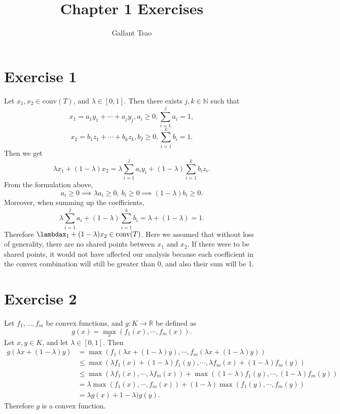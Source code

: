 \documentclass{article}
\title{Chapter 1 Exercises}
\author{Gallant Tsao}
\date{}
\begin{document}
\maketitle


\section*{Exercise 1}
Let $x_1, x_2 \in \text{conv}(T)$, and $\lambda \in [0, 1]$. Then there exists $j, k \in \mathbb{N}$ such that 
\[ x_1 = a_1 y_1 + \cdots + a_j y_j, a_i \geq 0, \sum_{i = 1}^{j} a_i = 1, \]
\[ x_2 = b_1 z_1 + \cdots + b_k z_k, b_I \geq 0, \sum_{i = 1}^{k} b_i = 1. \]
Then we get 
\[ \lambda x_1 + (1 - \lambda) x_2 
= \lambda \sum_{i = 1}^{j} a_i y_i + (1 - \lambda)\sum_{i = 1}^{k} b_i z_i. \]
From the formulation above, 
\[ a_i \geq 0 \implies \lambda a_i \geq 0, \ b_i \geq 0 \implies (1 - \lambda) b_i \geq 0. \]
Moreover, when summing up the coefficients, 
\[ \lambda \sum_{i = 1}^{j} a_i + (1 - \lambda) \sum_{i = 1}^{k} b_i = \lambda + (1 - \lambda) = 1. \]
Therefore $\lambdax_1 + (1 - \lambda)x_2 \in \text{conv}(T)$. Here we assumed that without loss of generality, 
there are no shared 
points between $x_1$ and $x_2$. If there were to be shared points, it would not have affected our analysis 
because each coefficient 
in the convex combination will still be greater than 0, and also their sum will be 1.


\newpage
\section*{Exercise 2}
Let $f_1, \dots, f_m$ be convex functions, and $g: K \to \mathbb{R}$ be defined as 
\[ g(x) = \max_{x}(f_1(x), \cdots, f_m(x)). \]
Let $x, y \in K$, and let $\lambda \in [0, 1]$. Then 
\begin{align*}
	g(\lambda x + (1 - \lambda)y) 
	&= \max_{}(f_1(\lambda x + (1 - \lambda)y), \cdots, f_m(\lambda x + (1 - \lambda)y)) \\
	&\leq \max_{}(\lambda f_1(x) + (1 - \lambda)f_1(y), \cdots, \lambda f_m(x) + (1 - \lambda) f_m(y)) \\
	&\leq \max_{}(\lambda f_1(x), \cdots, \lambda f_m(x)) + \max_{}((1 - \lambda)f_1(y), \cdots, (1 - \lambda)f_m(y)) \\
	&= \lambda \max_{}(f_1(x), \cdots, f_m(x)) + (1 - \lambda) \max_{}(f_1(y), \cdots, f_m(y)) \\
	&= \lambda g(x) + 1 - \lambda) g(y).
\end{align*}
Therefore $g$ is a convex function.
\end{document}
